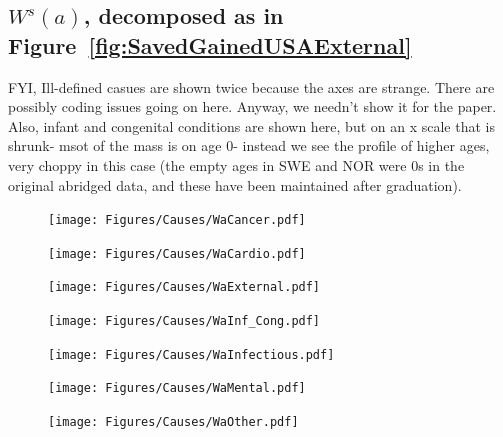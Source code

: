 \documentclass{article}
\begin{document}
\begin{appendices}
\subsection{$W^s(a)$, decomposed as in Figure~\ref{fig:SavedGainedUSAExternal}}
FYI, Ill-defined casues are shown twice because the axes are strange. There are
possibly coding issues going on here. Anyway, we needn't show it for the paper.
Also, infant and congenital conditions are shown here, but on an x scale that is
shrunk- msot of the mass is on age 0- instead we see the profile of higher ages,
very choppy in this case (the empty ages in SWE and NOR were 0s in the original
abridged data, and these have been maintained after graduation).
\begin{figure}
\centering
\texttt{[image: Figures/Causes/WaCancer.pdf]}
\end{figure}
\begin{figure}
\centering
\texttt{[image: Figures/Causes/WaCardio.pdf]}
\end{figure}
\begin{figure}
\centering
\texttt{[image: Figures/Causes/WaExternal.pdf]}
\end{figure}
\begin{figure}
\centering
\texttt{[image: Figures/Causes/WaInf\_Cong.pdf]}
\end{figure}
\begin{figure}
\centering
\texttt{[image: Figures/Causes/WaInfectious.pdf]}
\end{figure}
\begin{figure}
\centering
\texttt{[image: Figures/Causes/WaMental.pdf]}
\end{figure}
\begin{figure}
\centering
\texttt{[image: Figures/Causes/WaOther.pdf]}
\end{figure}

\pagebreak

\end{appendices}
\end{document}
